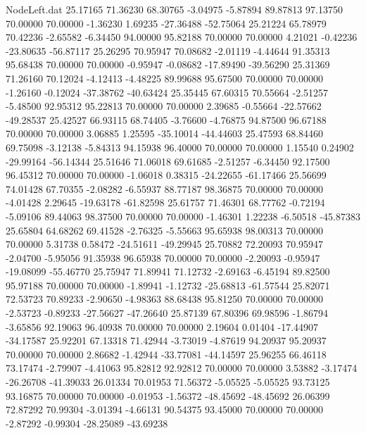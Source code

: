\begin{filecontents}{NodeLeft.dat}
  25.17165   71.36230   68.30765    -3.04975   -5.87894   89.87813   97.13750   70.00000   70.00000   -1.36230    1.69235  -27.36488  -52.75064
  25.21224   65.78979   70.42236    -2.65582   -6.34450   94.00000   95.82188   70.00000   70.00000    4.21021   -0.42236  -23.80635  -56.87117
  25.26295   70.95947   70.08682    -2.01119   -4.44644   91.35313   95.68438   70.00000   70.00000   -0.95947   -0.08682  -17.89490  -39.56290
  25.31369   71.26160   70.12024    -4.12413   -4.48225   89.99688   95.67500   70.00000   70.00000   -1.26160   -0.12024  -37.38762  -40.63424
  25.35445   67.60315   70.55664    -2.51257   -5.48500   92.95312   95.22813   70.00000   70.00000    2.39685   -0.55664  -22.57662  -49.28537
  25.42527   66.93115   68.74405    -3.76600   -4.76875   94.87500   96.67188   70.00000   70.00000    3.06885    1.25595  -35.10014  -44.44603
  25.47593   68.84460   69.75098    -3.12138   -5.84313   94.15938   96.40000   70.00000   70.00000    1.15540    0.24902  -29.99164  -56.14344
  25.51646   71.06018   69.61685    -2.51257   -6.34450   92.17500   96.45312   70.00000   70.00000   -1.06018    0.38315  -24.22655  -61.17466
  25.56699   74.01428   67.70355    -2.08282   -6.55937   88.77187   98.36875   70.00000   70.00000   -4.01428    2.29645  -19.63178  -61.82598
  25.61757   71.46301   68.77762    -0.72194   -5.09106   89.44063   98.37500   70.00000   70.00000   -1.46301    1.22238   -6.50518  -45.87383
  25.65804   64.68262   69.41528    -2.76325   -5.55663   95.65938   98.00313   70.00000   70.00000    5.31738    0.58472  -24.51611  -49.29945
  25.70882   72.20093   70.95947    -2.04700   -5.95056   91.35938   96.65938   70.00000   70.00000   -2.20093   -0.95947  -19.08099  -55.46770
  25.75947   71.89941   71.12732    -2.69163   -6.45194   89.82500   95.97188   70.00000   70.00000   -1.89941   -1.12732  -25.68813  -61.57544
  25.82071   72.53723   70.89233    -2.90650   -4.98363   88.68438   95.81250   70.00000   70.00000   -2.53723   -0.89233  -27.56627  -47.26640
  25.87139   67.80396   69.98596    -1.86794   -3.65856   92.19063   96.40938   70.00000   70.00000    2.19604    0.01404  -17.44907  -34.17587
  25.92201   67.13318   71.42944    -3.73019   -4.87619   94.20937   95.20937   70.00000   70.00000    2.86682   -1.42944  -33.77081  -44.14597
  25.96255   66.46118   73.17474    -2.79907   -4.41063   95.82812   92.92812   70.00000   70.00000    3.53882   -3.17474  -26.26708  -41.39033
  26.01334   70.01953   71.56372    -5.05525   -5.05525   93.73125   93.16875   70.00000   70.00000   -0.01953   -1.56372  -48.45692  -48.45692
  26.06399   72.87292   70.99304    -3.01394   -4.66131   90.54375   93.45000   70.00000   70.00000   -2.87292   -0.99304  -28.25089  -43.69238

\end{filecontents}
